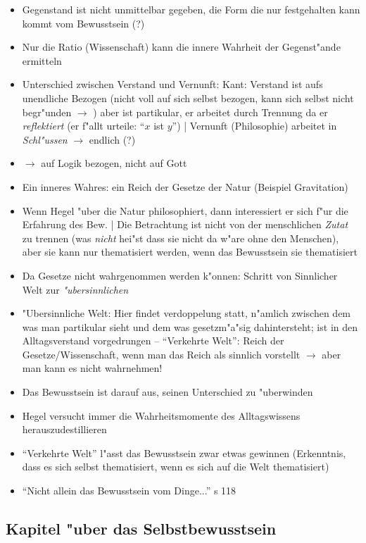 \documentclass[emulatestandardclasses]{scrartcl}
\begin{document}
\begin{itemize}
  \item Gegenstand ist nicht unmittelbar gegeben, die Form die nur festgehalten kann kommt vom Bewusstsein (?)
  \item Nur die Ratio (Wissenschaft) kann die innere Wahrheit der Gegenst"ande ermitteln
  \item Unterschied zwischen Verstand und Vernunft: Kant: Verstand ist aufs unendliche Bezogen (nicht voll auf sich selbst bezogen, kann sich selbst nicht begr"unden $\rightarrow$ ) aber ist partikular, er arbeitet durch Trennung da er \emph{reflektiert} (er f"allt urteile: "`$x$ ist $y$"') | Vernunft (Philosophie) arbeitet in \emph{Schl"ussen} $\rightarrow$ endlich (?)
  \item $\rightarrow$ auf Logik bezogen, nicht auf Gott
  \item Ein inneres Wahres: ein Reich der Gesetze der Natur (Beispiel Gravitation)
  \item Wenn Hegel "uber die Natur philosophiert, dann interessiert er sich f"ur die Erfahrung des Bew. | Die Betrachtung ist nicht von der menschlichen \emph{Zutat} zu trennen (was \emph{nicht} hei"st dass sie nicht da w"are ohne den Menschen), aber sie kann nur thematisiert werden, wenn das Bewusstsein sie thematisiert
  \item Da Gesetze nicht wahrgenommen werden k"onnen: Schritt von Sinnlicher Welt zur \emph{"ubersinnlichen}
  \item "Ubersinnliche Welt: Hier findet verdoppelung statt, n"amlich zwischen dem was man partikular sieht und dem was gesetzm"a"sig dahintersteht; ist in den Alltagsverstand vorgedrungen -- "`Verkehrte Welt"': Reich der Gesetze/Wissenschaft, wenn man das Reich als sinnlich vorstellt $\rightarrow$ aber man kann es nicht wahrnehmen!
  \item Das Bewusstsein ist darauf aus, seinen Unterschied zu "uberwinden
  \item Hegel versucht immer die Wahrheitsmomente des Alltagswissens herauszudestillieren
  \item "`Verkehrte Welt"' l"asst das Bewusstsein zwar etwas gewinnen (Erkenntnis, dass es sich selbst thematisiert, wenn es sich auf die Welt thematisiert)
  \item "`Nicht allein das Bewusstsein vom Dinge..."' s 118
\end{itemize}

\subsection{Kapitel "uber das Selbstbewusstsein}
\end{document}
